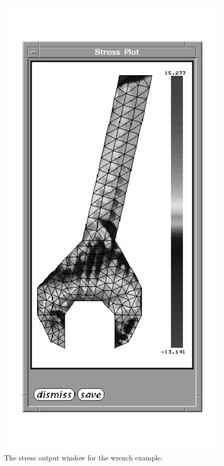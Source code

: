 \begin{figure}
\begin{center}
 \includegraphics[width=6in]{figures/velvet_stresses}
\end{center}
\caption{The stress output window for the wrench example.}
\label{velvet.stresses}
\end{figure}

